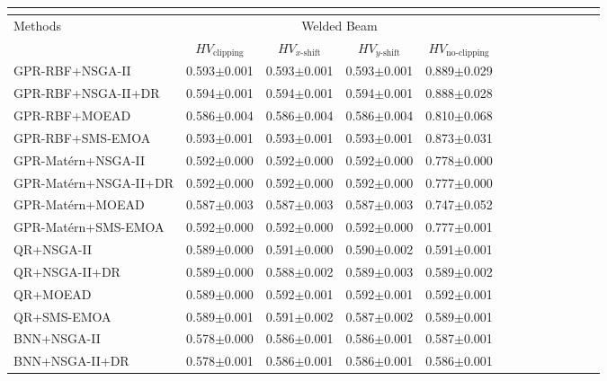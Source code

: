 \begin{table}[htbp]
{\begin{tabular}{l c c c c c c c c c c c c}
\hline
\multicolumn{13}{c}{} \\
\hline
Methods & \multicolumn{4}{c}{Welded Beam} & \multicolumn{4}{c}{} & \multicolumn{4}{c}{} \\
\cmidrule(lr){2-5}
 & $HV_{\mathrm{clipping}}$ & $HV_{x\text{-}\mathrm{shift}}$ & $HV_{y\text{-}\mathrm{shift}}$ & $HV_{\mathrm{no\text{-}clipping}}$ &  &  &  &  &  &  &  &  \\
\hline
GPR-RBF+NSGA-II & 0.593$\pm$0.001 & 0.593$\pm$0.001 & 0.593$\pm$0.001 & 0.889$\pm$0.029 &  &  &  &  &  &  &  &  \\
GPR-RBF+NSGA-II+DR & 0.594$\pm$0.001 & 0.594$\pm$0.001 & 0.594$\pm$0.001 & 0.888$\pm$0.028 &  &  &  &  &  &  &  &  \\
GPR-RBF+MOEAD & 0.586$\pm$0.004 & 0.586$\pm$0.004 & 0.586$\pm$0.004 & 0.810$\pm$0.068 &  &  &  &  &  &  &  &  \\
GPR-RBF+SMS-EMOA & 0.593$\pm$0.001 & 0.593$\pm$0.001 & 0.593$\pm$0.001 & 0.873$\pm$0.031 &  &  &  &  &  &  &  &  \\
GPR-Mat\'ern+NSGA-II & 0.592$\pm$0.000 & 0.592$\pm$0.000 & 0.592$\pm$0.000 & 0.778$\pm$0.000 &  &  &  &  &  &  &  &  \\
GPR-Mat\'ern+NSGA-II+DR & 0.592$\pm$0.000 & 0.592$\pm$0.000 & 0.592$\pm$0.000 & 0.777$\pm$0.000 &  &  &  &  &  &  &  &  \\
GPR-Mat\'ern+MOEAD & 0.587$\pm$0.003 & 0.587$\pm$0.003 & 0.587$\pm$0.003 & 0.747$\pm$0.052 &  &  &  &  &  &  &  &  \\
GPR-Mat\'ern+SMS-EMOA & 0.592$\pm$0.000 & 0.592$\pm$0.000 & 0.592$\pm$0.000 & 0.777$\pm$0.001 &  &  &  &  &  &  &  &  \\
QR+NSGA-II & 0.589$\pm$0.000 & 0.591$\pm$0.000 & 0.590$\pm$0.002 & 0.591$\pm$0.001 &  &  &  &  &  &  &  &  \\
QR+NSGA-II+DR & 0.589$\pm$0.000 & 0.588$\pm$0.002 & 0.589$\pm$0.003 & 0.589$\pm$0.002 &  &  &  &  &  &  &  &  \\
QR+MOEAD & 0.589$\pm$0.000 & 0.592$\pm$0.001 & 0.592$\pm$0.001 & 0.592$\pm$0.001 &  &  &  &  &  &  &  &  \\
QR+SMS-EMOA & 0.589$\pm$0.001 & 0.591$\pm$0.002 & 0.587$\pm$0.002 & 0.589$\pm$0.001 &  &  &  &  &  &  &  &  \\
BNN+NSGA-II & 0.578$\pm$0.000 & 0.586$\pm$0.001 & 0.586$\pm$0.001 & 0.587$\pm$0.001 &  &  &  &  &  &  &  &  \\
BNN+NSGA-II+DR & 0.578$\pm$0.001 & 0.586$\pm$0.001 & 0.586$\pm$0.001 & 0.586$\pm$0.001 &  &  &  &  &  &  &  &  \\

\end{tabular}}
\end{table}
